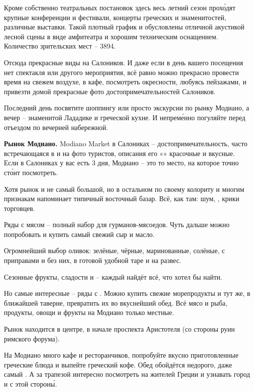 Кроме собственно театральных постановок здесь весь летний сезон прох\'{о}дят крупные конференции и фестивали, концерты греческих и  знаменитостей, различные выставки. Такой плотный график и  обусловлены отличной акустикой лесной сцены в виде амфитеатра и хорошим техническим оснащением. Количество зрительских мест -- 3894.

Отсюда прекрасные виды на  Салоников. И даже если в день вашего посещения нет спектакля или другого мероприятия, всё равно можно прекрасно провести время на свежем воздухе, в кафе, посмотреть окресности, любуясь пейзажами, и привезти домой прекрасные фото достопримечательностей Салоников.

Последний день посвятите шоппингу или просто экскурсии по рынку Модиано, а вечер -- знаменитой Лададике и греческой кухне. И непрем\'{е}нно погуляйте перед отъездом по вечерней набережной.

\textbf{Рынок Модиано.} Modiano Market в Салониках – достопримечательность, часто встречающаяся в  и на фото туристов, описания его «» красочные и вкусные. Если в Салониках у вас есть 3 дня, Модиано – это то место, на которое точно ст\'{о}ит посмотреть.

Хотя рынок и не самый большой, но в остальном по своему колориту и многим признакам напоминает типичный восточный базар. Всё, как там: шум, , крики торговцев.

Ряды с мясом – полный набор для гурманов-мясоедов. Чуть дальше можно попробовать и купить самый свежий сыр и масло.

Огромнейший выбор оливок: зелёные, чёрные, маринованные, солёные, с приправами и без них, в готовой удобной таре и на развес.

Сезонные фрукты, сладости и  -- каждый найдёт всё, что хотел бы найти.

Но самые интересные -- ряды с . Можно купить свежие морепродукты и тут же, в ближайшей таверне, превратить их во вкуснейший обед. Всё мясо и рыба, продукты, овощи и фрукты на Модиано только местные.

Рынок находится в центре, в начале проспекта Аристотеля (со стороны руин римского форума).

На Модиано много кафе и ресторанчиков, попробуйте вкусно приготовленные греческие блюда и выпейте греческий кофе. Обед обойдётся недорого, даже самый . А за трапезой интересно посмотреть на  жителей Греции и узнавать город и с этой сторон\'{ы}.

